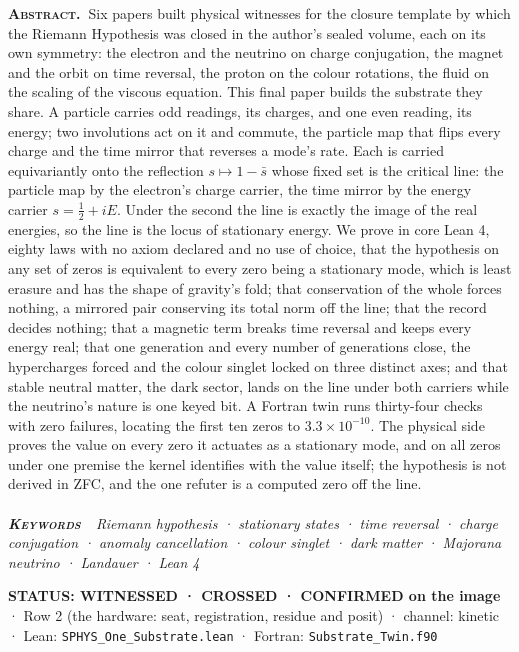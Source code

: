 \documentclass[10pt]{article}
\renewenvironment{quote}{\par\smallskip\noindent\small\color{deep}}{\par\smallskip}
\begin{document}
{\small\noindent\textbf{\scshape\color{deep}Abstract.\ }Six papers built
physical witnesses for the closure template by which the Riemann
Hypothesis was closed in the author's sealed volume, each on its own
symmetry: the electron and the neutrino on charge conjugation, the
magnet and the orbit on time reversal, the proton on the colour
rotations, the fluid on the scaling of the viscous equation. This final
paper builds the substrate they share. A particle carries odd readings,
its charges, and one even reading, its energy; two involutions act on it
and commute, the particle map that flips every charge and the time
mirror that reverses a mode's rate. Each is carried equivariantly onto
the reflection \(s\mapsto 1-\bar s\) whose fixed set is the critical
line: the particle map by the electron's charge carrier, the time mirror
by the energy carrier \(s=\tfrac12+iE\). Under the second the line is
exactly the image of the real energies, so the line is the locus of
stationary energy. We prove in core Lean 4, eighty laws with no axiom
declared and no use of choice, that the hypothesis on any set of zeros
is equivalent to every zero being a stationary mode, which is least
erasure and has the shape of gravity's fold; that conservation of the
whole forces nothing, a mirrored pair conserving its total norm off the
line; that the record decides nothing; that a magnetic term breaks time
reversal and keeps every energy real; that one generation and every
number of generations close, the hypercharges forced and the colour
singlet locked on three distinct axes; and that stable neutral matter,
the dark sector, lands on the line under both carriers while the
neutrino's nature is one keyed bit. A Fortran twin runs thirty-four
checks with zero failures, locating the first ten zeros to
\(3.3\times10^{-10}\). The physical side proves the value on every zero
it actuates as a stationary mode, and on all zeros under one premise the
kernel identifies with the value itself; the hypothesis is not derived
in ZFC, and the one refuter is a computed zero off the line.}\\[-2pt]
\noindent{\color{accent}\rule{\textwidth}{0.6pt}}\\[1pt]
{\itshape\footnotesize\color{faint}\noindent\textbf{\upshape\scshape\color{deep}Keywords\ }\ Riemann
hypothesis · stationary states · time reversal · charge conjugation ·
anomaly cancellation · colour singlet · dark matter · Majorana neutrino
· Landauer · Lean 4}\par\vspace{8pt}
\thispagestyle{fancy}
\begin{quote}
\textbf{STATUS: WITNESSED · CROSSED · CONFIRMED on the image} · Row 2
(the hardware: seat, registration, residue and posit) · channel: kinetic
· Lean: \texttt{SPHYS\_One\_Substrate.lean} · Fortran:
\texttt{Substrate\_Twin.f90}
\end{quote}
\end{document}
